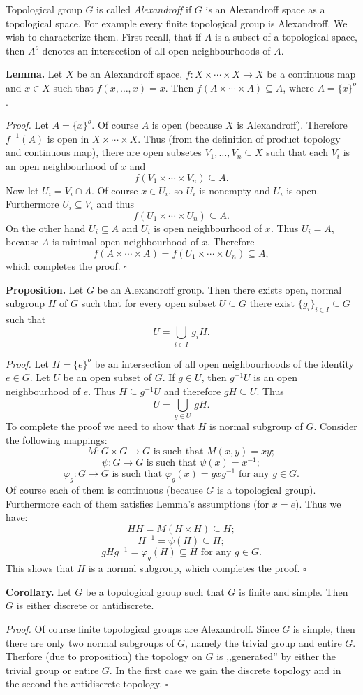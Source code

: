 \documentclass[12pt]{article}
\begin{document}
Topological group $G$ is called \textit{Alexandroff} if $G$ is an Alexandroff space as a topological space. For example every finite topological group is Alexandroff. We wish to characterize them. First recall, that if $A$ is a subset of a topological space, then $A^{o}$ denotes an intersection of all open neighbourhoods of $A$.

\textbf{Lemma.} Let $X$ be an Alexandroff space, $f:X\times\cdots\times X\to X$ be a continuous map and $x\in X$ such that $f(x,\ldots,x)=x$. Then $f(A\times\cdots\times A)\subseteq A$, where $A=\{x\}^{o}$.

\textit{Proof.} Let $A=\{x\}^{o}$. Of course $A$ is open (because $X$ is Alexandroff). Therefore $f^{-1}(A)$ is open in $X\times\cdots\times X$. Thus (from the definition of product topology and continuous map), there are open subsetes $V_1,\ldots, V_n\subseteq X$ such that each $V_i$ is an open neighbourhood of $x$ and $$f(V_1\times\cdots\times V_n)\subseteq A.$$ Now let $U_i=V_i\cap A$. Of course $x\in U_i$, so $U_i$ is nonempty and $U_i$ is open. Furthermore $U_i\subseteq V_i$ and thus $$f(U_1\times\cdots\times U_n)\subseteq A.$$
On the other hand $U_i\subseteq A$ and $U_i$ is open neighbourhood of $x$. Thus $U_i=A$, because $A$ is minimal open neighbourhood of $x$. Therefore $$f(A\times\cdots\times A)=f(U_1\times\cdots\times U_n)\subseteq A,$$
which completes the proof. $\square$

\textbf{Proposition.} Let $G$ be an Alexandroff group. Then there exists open, normal subgroup $H$ of $G$ such that for every open subset $U\subseteq G$ there exist $\{g_{i}\}_{i\in I}\subseteq G$ such that
$$U=\bigcup_{i\in I}\, g_iH.$$

\textit{Proof.} Let $H=\{e\}^{o}$ be an intersection of all open neighbourhoods of the identity $e\in G$. Let $U$ be an open subset of $G$. If $g\in U$, then $g^{-1}U$ is an open neighbourhood of $e$. Thus $H\subseteq g^{-1}U$ and therefore $gH\subseteq U$. Thus 
$$U=\bigcup_{g\in U}\, gH.$$
To complete the proof we need to show that $H$ is normal subgroup of $G$. Consider the following mappings:
$$M:G\times G\to G\mbox{ is such that }M(x,y)=xy;$$ $$\psi:G\to G\mbox{ is such that }\psi(x)=x^{-1};$$ $$\varphi_{g}:G\to G\mbox{ is such that }\varphi_{g}(x)=gxg^{-1}\mbox{ for any }g\in G.$$
Of course each of them is continuous (because $G$ is a topological group). Furthermore each of them satisfies Lemma's assumptions (for $x=e$). Thus we have:
$$HH=M(H\times H)\subseteq H;$$ $$H^{-1}=\psi(H)\subseteq H;$$ $$gHg^{-1}=\varphi_{g}(H)\subseteq H\mbox{ for any }g\in G.$$
This shows that $H$ is a normal subgroup, which completes the proof. $\square$

\textbf{Corollary.} Let $G$ be a topological group such that $G$ is finite and simple. Then $G$ is either discrete or antidiscrete.

\textit{Proof.} Of course finite topological groups are Alexandroff. Since $G$ is simple, then there are only two normal subgroups of $G$, namely the trivial group and entire $G$. Therfore (due to proposition) the topology on $G$ is ,,generated'' by either the trivial group or entire $G$. In the first case we gain the discrete topology and in the second the antidiscrete topology. $\square$
\end{document}
